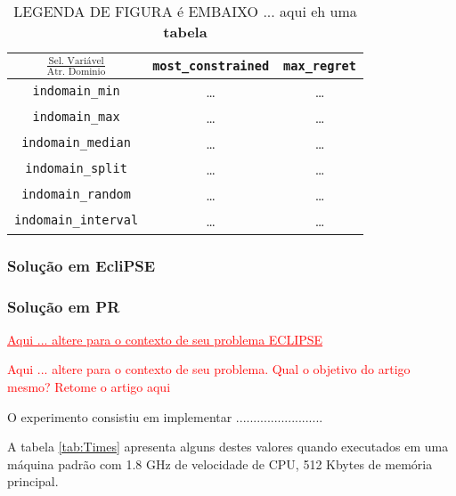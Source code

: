 \documentclass[12pt]{article}
\theoremstyle{definition}
\begin{document}
\begin{table}[!ht]

\caption{LEGENDA DE FIGURA é EMBAIXO ... aqui eh uma \textbf{tabela}}
\label{tab02}

{\small
\begin{center}
\begin{tabular}{c||c|c} \hline\hline
 $\frac{\textrm{Sel. Variável}}{\textrm{Atr. Dominio}}$ 
&  \texttt{most\_constrained}  & \texttt{max\_regret}
 \\ \hline\hline
\texttt{indomain\_min} &  \ldots & \ldots \\ \hline
\texttt{indomain\_max}  & \ldots  & \ldots \\ \hline
\texttt{indomain\_median}  &  \ldots & \ldots \\ \hline
 \texttt{indomain\_split} & \ldots & \ldots \\ \hline
\texttt{indomain\_random} & \ldots & \ldots \\ \hline
\texttt{indomain\_interval}  & \ldots  & \ldots \\ \hline\hline

\end{tabular}
\end{center}
}

\end{table}




\subsubsection{Solução em EcliPSE}



\subsubsection{Solução em PR}



{\Large \textcolor{red}{\underline {Aqui ... altere para o 
contexto de seu problema ECLIPSE}}}

{\Large \textcolor{red}{Aqui ... altere para o 
contexto de seu problema. Qual o objetivo do 
artigo mesmo? Retome o artigo aqui}}

O experimento consistiu em implementar .........................



 A tabela \ref{tab:Times} apresenta alguns destes valores quando executados em uma máquina padrão com 1.8 GHz de velocidade de CPU, 512 Kbytes de memória principal.
\end{document}
